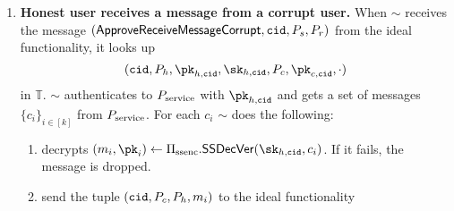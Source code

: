 \begin{enumerate}
	\item \textbf{Honest user receives a message from a corrupt user.} When $\sim$ receives the message $(\mathsf{ApproveReceiveMessageCorrupt}, \mathtt{cid}, P_s, P_r)$ from the ideal functionality, it looks up $$(\convoid, P_h, \pk_{h,\convoid}, \sk_{h,\convoid}, P_c, \pk_{c,\convoid}, \cdot)$$ in $\mathbb{T}.$ $\sim$ authenticates to $P_{\text{service}}$ with $\pk_{h,\convoid}$ and gets a set of messages $\{c_i\}_{i\in[k]}$ from $P_{\text{service}}$. For each $c_i$ $\sim$ does the following:
	\begin{enumerate}
		\item decrypts $(m_i,\pk_i) \leftarrow \sealedsenderencryptionscheme.\sealedsenderencryptionvdec(\sk_{h,\convoid}, c_i)$. If it fails, the message is dropped.
		\item send the tuple $(\mathtt{cid}, P_c, P_h, m_i)$ to the ideal functionality
	\end{enumerate} 

\end{enumerate}









